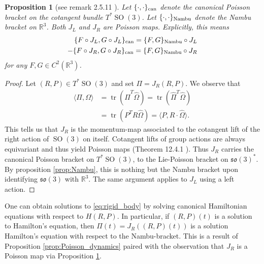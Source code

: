 \documentclass[12pt]{amsart}
\newcommand{\so}{\ensuremath{\mathfrak{so}}}
\newtheorem{prop}[thm]{Proposition}
\DeclareMathOperator{\SO}{SO}
\DeclareMathOperator{\tr}{tr}
\begin{document}
  \begin{prop}[see remark 2.5.11 \cite{HolmBook2}] \label{prop:SO3_to_Nambu}
    Let $\{ \cdot , \cdot \}_{\rm can}$ denote the canonical Poisson bracket
    on the cotangent bundle $T^{\ast}\SO(3)$.
    Let $\{ \cdot , \cdot \}_{\rm Nambu}$ denote the Nambu bracket on $\mathbb{R}^3$.
    Both $J_L$ and $J_R$ are Poisson maps.
    Explicitly, this means
    \begin{align*}
      \{ F \circ J_L , G \circ J_L \}_{\rm can} = \{ F , G \}_{\rm Nambu} \circ J_L \\
      - \{ F \circ J_R , G \circ J_R \}_{\rm can} = \{ F , G \}_{\rm Nambu} \circ J_R \\
    \end{align*}
    for any $F,G \in C^2( \mathbb{R}^3)$.
  \end{prop}
  \begin{proof}
    Let $(R,P) \in T^{\ast}\SO(3)$ and set $\Pi = J_R(R,P)$.
    We observe that
    \begin{align*}
      \langle \Pi , \Omega \rangle &= \tr( \hat{\Pi}^T \hat{\Omega} )
      = \tr( \hat{\Pi}^T \hat{\Omega} ) \\
      &= \tr( P^T R \hat{\Omega} ) 
      = \langle P , R \cdot \hat{\Omega} \rangle.
    \end{align*}
    This tells us that $J_R$ is the momentum-map associated
    to the cotangent lift of the right action of $\SO(3)$ on itself.
    Cotangent lifts of group actions are always equivariant
    and thus yield Poisson maps (Theorem 12.4.1 \cite{MandS}).
    Thus $J_R$ carries the canonical
    Poisson bracket on $T^{\ast}\SO(3)$, to the Lie-Poisson
    bracket on $\so(3)^*$.
    By proposition \ref{prop:Nambu}, this is nothing but the
    Nambu bracket upon identifying $\so(3)$ with $\mathbb{R}^3$.
    The same argument applies to $J_L$ using a left action.
  \end{proof}

  One can obtain solutions to \eqref{eq:rigid_body}
  by solving canonical Hamiltonian equations with respect to $H(R,P)$.
  In particular, if $(R,P)(t)$ is a solution to Hamilton's equation,
  then $\Pi(t) = J_R( (R,P)(t))$ is a solution Hamilton's equation
  with respect to the Nambu-bracket.
  This is a result of Proposition \ref{prop:Poisson_dynamics}
  paired with the observation that $J_R$ is a Poisson map via
  Proposition \ref{prop:SO3_to_Nambu}.
\end{document}
